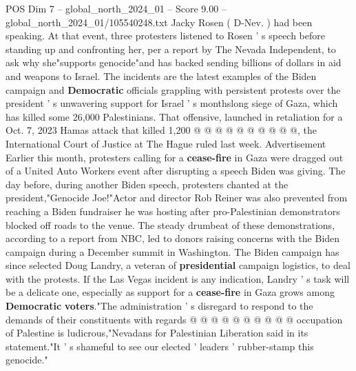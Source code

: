\begin{textsample}{POS Dim 7 – global\_north\_2024\_01 – Score 9.00 – global\_north\_2024\_01/105540248.txt}
Jacky Rosen ( D-Nev. ) had been speaking.
At that event, three protesters listened to Rosen ' s speech before standing up and confronting her, per a report by The Nevada Independent, to ask why she"supports genocide"and has backed sending billions of dollars in aid and weapons to Israel.
The incidents are the latest examples of the Biden campaign and \textbf{Democratic} officials grappling with persistent protests over the president ' s unwavering support for Israel ' s monthslong siege of Gaza, which has killed some 26,000 Palestinians.
That offensive, launched in retaliation for a Oct. 7, 2023 Hamas attack that killed 1,200 @ @ @ @ @ @ @ @ @ @, the International Court of Justice at The Hague ruled last week.
Advertisement Earlier this month, protesters calling for a \textbf{cease-fire} in Gaza were dragged out of a United Auto Workers event after disrupting a speech Biden was giving.
The day before, during another Biden speech, protesters chanted at the president,"Genocide Joe!"Actor and director Rob Reiner was also prevented from reaching a Biden fundraiser he was hosting after pro-Palestinian demonstrators blocked off roads to the venue.
The steady drumbeat of these demonstrations, according to a report from NBC, led to donors raising concerns with the Biden campaign during a December summit in Washington.
The Biden campaign has since selected Doug Landry, a veteran of \textbf{presidential} campaign logistics, to deal with the protests.
If the Las Vegas incident is any indication, Landry ' s task will be a delicate one, especially as support for a \textbf{cease-fire} in Gaza grows among \textbf{Democratic} \textbf{voters}."The administration ' s disregard to respond to the demands of their constituents with regards @ @ @ @ @ @ @ @ @ @ occupation of Palestine is ludicrous,"Nevadans for Palestinian Liberation said in its statement."It ' s shameful to see our elected ' leaders ' rubber-stamp this genocide."

\end{textsample}
